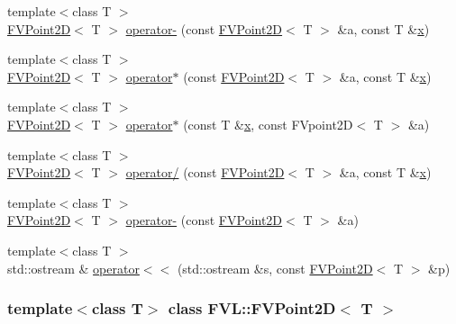 \begin{DoxyCompactItemize}
\item 
{\footnotesize template$<$class T $>$ }\\\hyperlink{classFVL_1_1FVPoint2D}{FVPoint2D}$<$ T $>$ \hyperlink{classFVL_1_1FVPoint2D_afe243e86f8ce7b530db3cb29b5eb5445}{operator-\/} (const \hyperlink{classFVL_1_1FVPoint2D}{FVPoint2D}$<$ T $>$ \&a, const T \&\hyperlink{classFVL_1_1FVPoint2D_a9a4f74af87a76a4c3dcb729cb0e68f8d}{x})
\item 
{\footnotesize template$<$class T $>$ }\\\hyperlink{classFVL_1_1FVPoint2D}{FVPoint2D}$<$ T $>$ \hyperlink{classFVL_1_1FVPoint2D_a4bd99f7765dfe89c3d604c9869199e70}{operator$\ast$} (const \hyperlink{classFVL_1_1FVPoint2D}{FVPoint2D}$<$ T $>$ \&a, const T \&\hyperlink{classFVL_1_1FVPoint2D_a9a4f74af87a76a4c3dcb729cb0e68f8d}{x})
\item 
{\footnotesize template$<$class T $>$ }\\\hyperlink{classFVL_1_1FVPoint2D}{FVPoint2D}$<$ T $>$ \hyperlink{classFVL_1_1FVPoint2D_a33ef3d47d5f25efdc6bdf7176e374778}{operator$\ast$} (const T \&\hyperlink{classFVL_1_1FVPoint2D_a9a4f74af87a76a4c3dcb729cb0e68f8d}{x}, const FVpoint2D$<$ T $>$ \&a)
\item 
{\footnotesize template$<$class T $>$ }\\\hyperlink{classFVL_1_1FVPoint2D}{FVPoint2D}$<$ T $>$ \hyperlink{classFVL_1_1FVPoint2D_a4ae7766bcafa795d446813b5ecfbabad}{operator/} (const \hyperlink{classFVL_1_1FVPoint2D}{FVPoint2D}$<$ T $>$ \&a, const T \&\hyperlink{classFVL_1_1FVPoint2D_a9a4f74af87a76a4c3dcb729cb0e68f8d}{x})
\item 
{\footnotesize template$<$class T $>$ }\\\hyperlink{classFVL_1_1FVPoint2D}{FVPoint2D}$<$ T $>$ \hyperlink{classFVL_1_1FVPoint2D_a209f554d792ea630ece13d82e122f149}{operator-\/} (const \hyperlink{classFVL_1_1FVPoint2D}{FVPoint2D}$<$ T $>$ \&a)
\item 
{\footnotesize template$<$class T $>$ }\\std::ostream \& \hyperlink{classFVL_1_1FVPoint2D_a1f20f9e0aa6bcd31fbfc819c3d9f1e29}{operator$<$$<$} (std::ostream \&s, const \hyperlink{classFVL_1_1FVPoint2D}{FVPoint2D}$<$ T $>$ \&p)
\end{DoxyCompactItemize}
\subsubsection*{template$<$class T$>$ class FVL::FVPoint2D$<$ T $>$}




